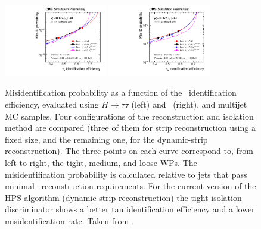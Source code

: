 \begin{figure}[ht]
  \begin{center}
    \includegraphics[width=0.4\textwidth]{figuras/Chapter3/IsoPerformanceHiggs}
    \includegraphics[width=0.4\textwidth]{figuras/Chapter3/IsoPerformanceZprime}
    \caption{Misidentification probability as a function of the \tauh~identification 
    efficiency, evaluated using $H \rightarrow \tau\tau$ (left) and \Zprimetotautau~(right), 
    and multijet MC samples. Four configurations of the reconstruction and 
    isolation method are compared (three of them for strip reconstruction using a 
    fixed  size, and the remaining one, for the dynamic-strip reconstruction). The three points 
    on each curve correspond to, from left to right, the tight, medium, and loose WPs. The
    misidentification probability is calculated relative to jets that pass minimal \tauh~reconstruction
    requirements. For the current version of the HPS algorithm (dynamic-strip reconstruction) the 
    tight isolation discriminator shows a better tau identification efficiency and a 
    lower misidentification rate. Taken from \cite{CMS-PAS-TAU-16-002}.
    }
    \label{fig:IsoSumPerformance}
  \end{center}
\end{figure} 

